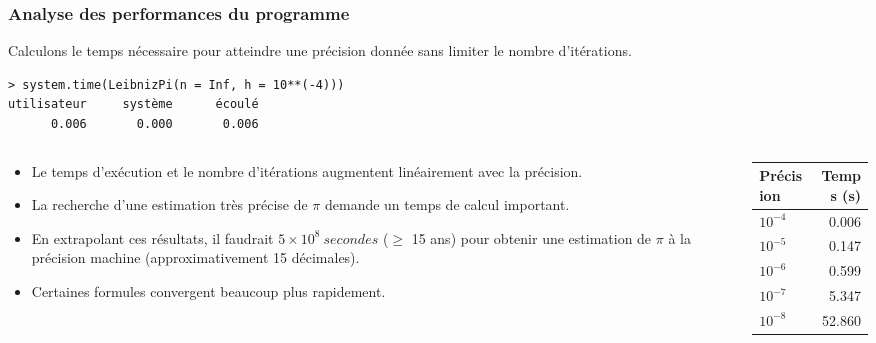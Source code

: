 \documentclass[10pt]{beamer}
\begin{document}
\begin{frame}[fragile]
  \frametitle{Analyse des performances du programme}
  Calculons le temps nécessaire pour atteindre une précision donnée sans limiter le nombre d'itérations.
  \begin{lstlisting}
> system.time(LeibnizPi(n = Inf, h = 10**(-4)))
utilisateur     système      écoulé 
      0.006       0.000       0.006 
    \end{lstlisting}

    
\begin{columns}[t]
\begin{column}{0.7\textwidth}
  \begin{itemize}
  \item Le temps d’exécution et le nombre d'itérations augmentent linéairement avec la précision.
  \item La recherche d’une estimation très précise de $\pi$ demande un temps de calcul important.
  
  \item En extrapolant ces résultats, il faudrait  $5 \times 10^8\ secondes$ ($\geq$ 15 ans) pour obtenir une estimation de $\pi$ à la précision machine (approximativement 15 décimales).
  \item<alert@1> Certaines formules convergent beaucoup plus rapidement.
  \end{itemize}
\end{column}
\begin{column}{0.3\textwidth}
  \begin{table}[h]
    \centering
    \begin{tabular}{lr}
      \toprule
      Précision & Temps (s) \\
      \midrule
      $10^{-4}$ & 0.006     \\
      $10^{-5}$ & 0.147     \\
      $10^{-6}$ & 0.599     \\
      $10^{-7}$ & 5.347     \\
      $10^{-8}$ & 52.860    \\
      \bottomrule
    \end{tabular}
  \end{table}
\end{column}
\end{columns}
\end{frame}
\end{document}
